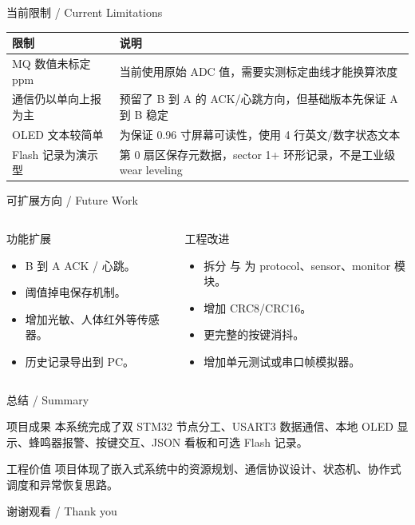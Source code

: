 \documentclass[aspectratio=169,10pt]{ctexbeamer}
\newcommand{\code}[1]{\texttt{\small\detokenize{#1}}}
\begin{document}
\begin{frame}{当前限制 / Current Limitations}
  \begin{tabularx}{\textwidth}{@{}p{}Y@{}}
    \toprule
    限制 & 说明 \\
    \midrule
    MQ 数值未标定 ppm & 当前使用原始 ADC 值，需要实测标定曲线才能换算浓度 \\
    通信仍以单向上报为主 & 预留了 B 到 A 的 ACK/心跳方向，但基础版本先保证 A 到 B 稳定 \\
    OLED 文本较简单 & 为保证 0.96 寸屏幕可读性，使用 4 行英文/数字状态文本 \\
    Flash 记录为演示型 & 第 0 扇区保存元数据，sector 1+ 环形记录，不是工业级 wear leveling \\
    \bottomrule
  \end{tabularx}
\end{frame}

\begin{frame}{可扩展方向 / Future Work}
  \begin{columns}[T,onlytextwidth]
    \begin{column}{0.5\textwidth}
      \begin{block}{功能扩展}
        \begin{itemize}
          \item B 到 A ACK / 心跳。
          \item 阈值掉电保存机制。
          \item 增加光敏、人体红外等传感器。
          \item 历史记录导出到 PC。
        \end{itemize}
      \end{block}
    \end{column}
    \begin{column}{0.46\textwidth}
      \begin{block}{工程改进}
        \begin{itemize}
          \item 拆分 \code{main.cpp} 与 \code{App/} 为 protocol、sensor、monitor 模块。
          \item 增加 CRC8/CRC16。
          \item 更完整的按键消抖。
          \item 增加单元测试或串口帧模拟器。
        \end{itemize}
      \end{block}
    \end{column}
  \end{columns}
\end{frame}

\begin{frame}{总结 / Summary}
  \begin{block}{项目成果}
    本系统完成了双 STM32 节点分工、USART3 数据通信、本地 OLED 显示、蜂鸣器报警、按键交互、JSON 看板和可选 Flash 记录。
  \end{block}
  \begin{block}{工程价值}
    项目体现了嵌入式系统中的资源规划、通信协议设计、状态机、协作式调度和异常恢复思路。
  \end{block}
  \begin{center}
    \Large 谢谢观看 / Thank you
  \end{center}
\end{frame}
\end{document}
